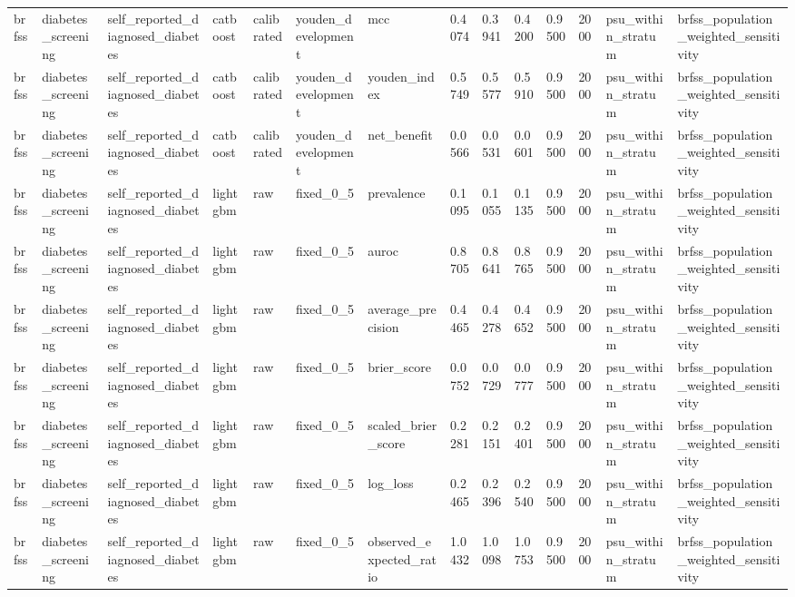 \begin{tabular}{llllllllllllll}
brfss & diabetes\_screening & self\_reported\_diagnosed\_diabetes & catboost & calibrated & youden\_development & mcc & 0.4074 & 0.3941 & 0.4200 & 0.9500 & 2000 & psu\_within\_stratum & brfss\_population\_weighted\_sensitivity \\
brfss & diabetes\_screening & self\_reported\_diagnosed\_diabetes & catboost & calibrated & youden\_development & youden\_index & 0.5749 & 0.5577 & 0.5910 & 0.9500 & 2000 & psu\_within\_stratum & brfss\_population\_weighted\_sensitivity \\
brfss & diabetes\_screening & self\_reported\_diagnosed\_diabetes & catboost & calibrated & youden\_development & net\_benefit & 0.0566 & 0.0531 & 0.0601 & 0.9500 & 2000 & psu\_within\_stratum & brfss\_population\_weighted\_sensitivity \\
brfss & diabetes\_screening & self\_reported\_diagnosed\_diabetes & lightgbm & raw & fixed\_0\_5 & prevalence & 0.1095 & 0.1055 & 0.1135 & 0.9500 & 2000 & psu\_within\_stratum & brfss\_population\_weighted\_sensitivity \\
brfss & diabetes\_screening & self\_reported\_diagnosed\_diabetes & lightgbm & raw & fixed\_0\_5 & auroc & 0.8705 & 0.8641 & 0.8765 & 0.9500 & 2000 & psu\_within\_stratum & brfss\_population\_weighted\_sensitivity \\
brfss & diabetes\_screening & self\_reported\_diagnosed\_diabetes & lightgbm & raw & fixed\_0\_5 & average\_precision & 0.4465 & 0.4278 & 0.4652 & 0.9500 & 2000 & psu\_within\_stratum & brfss\_population\_weighted\_sensitivity \\
brfss & diabetes\_screening & self\_reported\_diagnosed\_diabetes & lightgbm & raw & fixed\_0\_5 & brier\_score & 0.0752 & 0.0729 & 0.0777 & 0.9500 & 2000 & psu\_within\_stratum & brfss\_population\_weighted\_sensitivity \\
brfss & diabetes\_screening & self\_reported\_diagnosed\_diabetes & lightgbm & raw & fixed\_0\_5 & scaled\_brier\_score & 0.2281 & 0.2151 & 0.2401 & 0.9500 & 2000 & psu\_within\_stratum & brfss\_population\_weighted\_sensitivity \\
brfss & diabetes\_screening & self\_reported\_diagnosed\_diabetes & lightgbm & raw & fixed\_0\_5 & log\_loss & 0.2465 & 0.2396 & 0.2540 & 0.9500 & 2000 & psu\_within\_stratum & brfss\_population\_weighted\_sensitivity \\
brfss & diabetes\_screening & self\_reported\_diagnosed\_diabetes & lightgbm & raw & fixed\_0\_5 & observed\_expected\_ratio & 1.0432 & 1.0098 & 1.0753 & 0.9500 & 2000 & psu\_within\_stratum & brfss\_population\_weighted\_sensitivity \\

\end{tabular}
